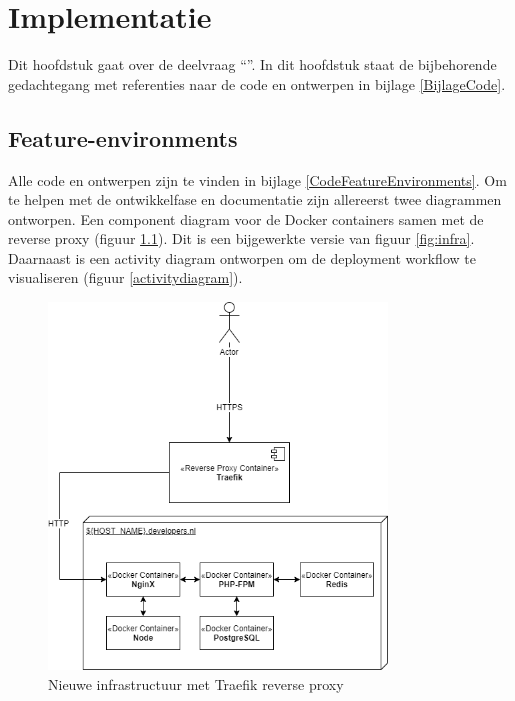 \chapter{Implementatie}

\label{Chapter6}

Dit hoofdstuk gaat over de deelvraag \enquote{\deelimplementatie}. In dit hoofdstuk staat de bijbehorende gedachtegang met referenties naar de code en ontwerpen in bijlage \ref{BijlageCode}.

\section{Feature-environments} \label{implementatieFeatureEnvs}

Alle code en ontwerpen zijn te vinden in bijlage \ref{CodeFeatureEnvironments}. Om te helpen met de ontwikkelfase en documentatie zijn allereerst twee diagrammen ontworpen. Een component diagram voor de Docker containers samen met de reverse proxy (figuur \ref{traefikinfrastructure}). Dit is een bijgewerkte versie van figuur \ref{fig:infra}. Daarnaast is een activity diagram ontworpen om de deployment workflow te visualiseren (figuur \ref{activitydiagram}).

\begin{figure}[H]
	\centering
	\includegraphics[width=9cm]{Figures/Traefik}
	\decoRule
	\caption[Traefik Infrastructure]{Nieuwe infrastructuur met Traefik reverse proxy}
	\label{traefikinfrastructure}
\end{figure}


